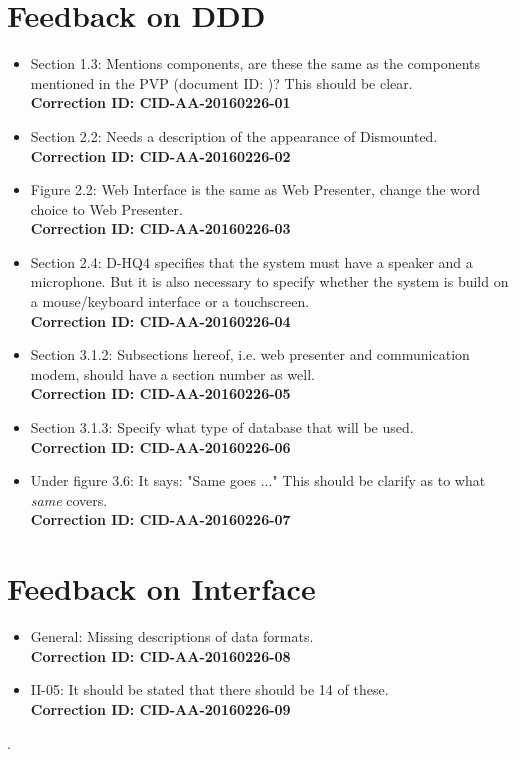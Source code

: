 \section*{Feedback on DDD}
\begin{itemize}
    \item Section 1.3: Mentions components, are these the same as the components mentioned in the PVP (document ID: \pvp)? This should be clear.
    \\ \textbf{Correction ID: CID-AA-20160226-01}
    
    \item Section 2.2: Needs a description of the appearance of Dismounted.
    \\ \textbf{Correction ID: CID-AA-20160226-02}
    
    \item Figure 2.2: Web Interface is the same as Web Presenter, change the word choice to Web Presenter.
    \\ \textbf{Correction ID: CID-AA-20160226-03}
    
    \item Section 2.4: D-HQ4 specifies that the system must have a speaker and a microphone. But it is also necessary to specify whether the system is build on a mouse/keyboard interface or a touchscreen.
    \\ \textbf{Correction ID: CID-AA-20160226-04}

    \item Section 3.1.2: Subsections hereof, i.e. web presenter and communication modem, should have a section number as well.
    \\ \textbf{Correction ID: CID-AA-20160226-05}
    
    \item Section 3.1.3: Specify what type of database that will be used.
    \\ \textbf{Correction ID: CID-AA-20160226-06}
    
    \item Under figure 3.6: It says: "Same goes ..." This should be clarify as to what \emph{same} covers.
    \\ \textbf{Correction ID: CID-AA-20160226-07}
\end{itemize}

\newpage
\section*{Feedback on Interface}
\begin{itemize}
    \item General: Missing descriptions of data formats.
    \\ \textbf{Correction ID: CID-AA-20160226-08}
    
    \item II-05: It should be stated that there should be 14 of these.
    \\ \textbf{Correction ID: CID-AA-20160226-09}
\end{itemize}.

